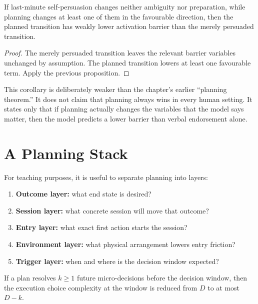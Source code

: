 \begin{corollary}
If last-minute self-persuasion changes neither ambiguity nor preparation, while
planning changes at least one of them in the favourable direction, then the
planned transition has weakly lower activation barrier than the merely
persuaded transition.
\end{corollary}

\begin{proof}
The merely persuaded transition leaves the relevant barrier variables unchanged
by assumption. The planned transition lowers at least one favourable term.
Apply the previous proposition.
\end{proof}

\begin{remark}
This corollary is deliberately weaker than the chapter's earlier ``planning
theorem.'' It does not claim that planning always wins in every human setting.
It states only that if planning actually changes the variables that the model
says matter, then the model predicts a lower barrier than verbal endorsement
alone.
\end{remark}

\section{A Planning Stack}

For teaching purposes, it is useful to separate planning into layers:
\begin{enumerate}[nosep]
  \item \textbf{Outcome layer:} what end state is desired?
  \item \textbf{Session layer:} what concrete session will move that outcome?
  \item \textbf{Entry layer:} what exact first action starts the session?
  \item \textbf{Environment layer:} what physical arrangement lowers entry
        friction?
  \item \textbf{Trigger layer:} when and where is the decision window expected?
\end{enumerate}

\begin{proposition}
If a plan resolves $k \geq 1$ future micro-decisions before the decision
window, then the execution choice complexity at the window is reduced from $D$
to at most $D-k$.
\end{proposition}

